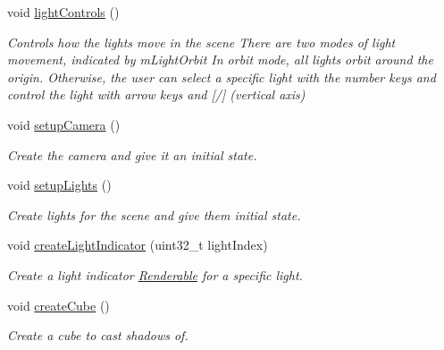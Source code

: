 \begin{DoxyCompactItemize}
\mbox{\label{class_vk_app_a938cd4f0332fa8b6c91bca2e8816601d}} 
void \mbox{\hyperlink{class_vk_app_a938cd4f0332fa8b6c91bca2e8816601d}{light\+Controls}} ()
\begin{DoxyCompactList}\small\item\em Controls how the lights move in the scene There are two modes of light movement, indicated by m\+Light\+Orbit In orbit mode, all lights orbit around the origin. Otherwise, the user can select a specific light with the number keys and control the light with arrow keys and \mbox{[}/\mbox{]} (vertical axis) \end{DoxyCompactList}\item 
\mbox{\label{class_vk_app_aeb618057cd3c8b121ffcff60842067eb}} 
void \mbox{\hyperlink{class_vk_app_aeb618057cd3c8b121ffcff60842067eb}{setup\+Camera}} ()
\begin{DoxyCompactList}\small\item\em Create the camera and give it an initial state. \end{DoxyCompactList}\item 
\mbox{\label{class_vk_app_ad91fbd6cab8a4f0ff6cdab87f06818d7}} 
void \mbox{\hyperlink{class_vk_app_ad91fbd6cab8a4f0ff6cdab87f06818d7}{setup\+Lights}} ()
\begin{DoxyCompactList}\small\item\em Create lights for the scene and give them initial state. \end{DoxyCompactList}\item 
void \mbox{\hyperlink{class_vk_app_af1a2158abcf0fecfc795a4194a4d042c}{create\+Light\+Indicator}} (uint32\+\_\+t light\+Index)
\begin{DoxyCompactList}\small\item\em Create a light indicator \mbox{\hyperlink{class_renderable}{Renderable}} for a specific light. \end{DoxyCompactList}\item 
\mbox{\label{class_vk_app_a31152ba8ba4553a63debf0a1c2aed036}} 
void \mbox{\hyperlink{class_vk_app_a31152ba8ba4553a63debf0a1c2aed036}{create\+Cube}} ()
\begin{DoxyCompactList}\small\item\em Create a cube to cast shadows of. \end{DoxyCompactList}\item 

\end{DoxyCompactItemize}
